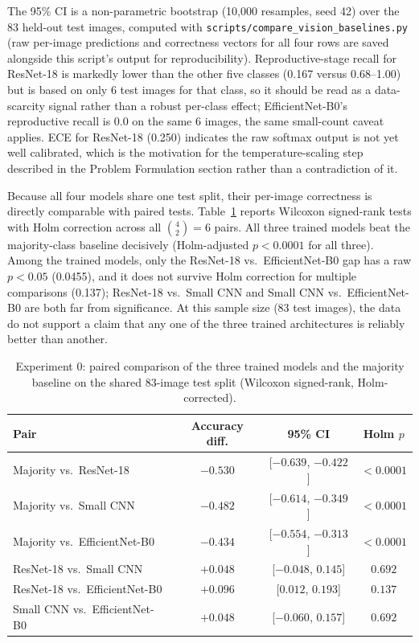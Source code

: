 \documentclass[conference]{IEEEtran}
\begin{document}
The 95\% CI is a non-parametric bootstrap (10{,}000 resamples, seed 42) over the 83 held-out test images, computed with \texttt{scripts/compare\_vision\_baselines.py} (raw per-image predictions and correctness vectors for all four rows are saved alongside this script's output for reproducibility). Reproductive-stage recall for ResNet-18 is markedly lower than the other five classes (0.167 versus 0.68--1.00) but is based on only 6 test images for that class, so it should be read as a data-scarcity signal rather than a robust per-class effect; EfficientNet-B0's reproductive recall is 0.0 on the same 6 images, the same small-count caveat applies. ECE for ResNet-18 (0.250) indicates the raw softmax output is not yet well calibrated, which is the motivation for the temperature-scaling step described in the Problem Formulation section rather than a contradiction of it.

Because all four models share one test split, their per-image correctness is directly comparable with paired tests. Table~\ref{tab:vision-pairwise} reports Wilcoxon signed-rank tests with Holm correction across all $\binom{4}{2}=6$ pairs. All three trained models beat the majority-class baseline decisively (Holm-adjusted $p<0.0001$ for all three). Among the trained models, only the ResNet-18 vs.\ EfficientNet-B0 gap has a raw $p<0.05$ (0.0455), and it does not survive Holm correction for multiple comparisons (0.137); ResNet-18 vs.\ Small CNN and Small CNN vs.\ EfficientNet-B0 are both far from significance. At this sample size (83 test images), the data do not support a claim that any one of the three trained architectures is reliably better than another.

\begin{table}[t]
\caption{Experiment 0: paired comparison of the three trained models and the majority baseline on the shared 83-image test split (Wilcoxon signed-rank, Holm-corrected).}
\label{tab:vision-pairwise}
\centering
\footnotesize
\begin{tabular}{lccc}
\toprule
Pair & Accuracy diff. & 95\% CI & Holm $p$ \\
\midrule
Majority vs.\ ResNet-18 & $-0.530$ & [$-0.639$, $-0.422$] & $<0.0001$ \\
Majority vs.\ Small CNN & $-0.482$ & [$-0.614$, $-0.349$] & $<0.0001$ \\
Majority vs.\ EfficientNet-B0 & $-0.434$ & [$-0.554$, $-0.313$] & $<0.0001$ \\
ResNet-18 vs.\ Small CNN & $+0.048$ & [$-0.048$, $0.145$] & $0.692$ \\
ResNet-18 vs.\ EfficientNet-B0 & $+0.096$ & [$0.012$, $0.193$] & $0.137$ \\
Small CNN vs.\ EfficientNet-B0 & $+0.048$ & [$-0.060$, $0.157$] & $0.692$ \\
\bottomrule
\end{tabular}
\end{table}
\end{document}
